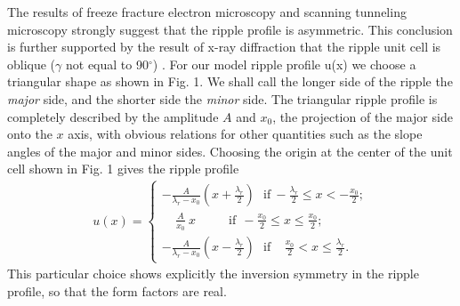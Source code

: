The results of freeze fracture electron microscopy \cite{Luna77,Cop80,Rup83} and
scanning tunneling microscopy \cite{Zas88a,Hata93} strongly suggest that the
ripple profile is asymmetric.  This conclusion is further supported by 
the result
of x-ray diffraction that the ripple unit cell is oblique
($\gamma$ not equal to 90$^{\circ}$) 
\cite{Tar73,JanSS79,Ino80,Ale85,Sir88,Wac89a,Kat95}.
For our model ripple profile
u(x) we choose a triangular shape as shown in
Fig. 1.  We shall call the longer side of the ripple
the {\it major} side, and the shorter side the {\it minor} side.
The triangular ripple profile is completely described by the amplitude
$A$ and $x_0$, the projection of the major side onto the $x$ axis,
with obvious relations for other quantities such as the slope angles
of the major and minor sides.  Choosing the origin at the center
of the unit cell shown in Fig. 1 gives the ripple profile
\begin{eqnarray}
\label{profile}
u(x) = \left\{ \begin{array}{ll}
		-\frac{A}{\lambda_r - x_0} (x + \frac{\lambda_r}{2})
\ \ \ \mbox{if}\ - \frac{\lambda_r}{2} \le x < - \frac{x_0}{2};\\
		\ \ \ \ \ \frac{A}{x_0}\ x\ \ \ \ \ \ \ \ \ \ \ \ \mbox{if}
\ \ - \frac{x_0}{2} \le x \le 
\frac{x_0}{2};\\
		-\frac{A}{\lambda_r - x_0} (x - \frac{\lambda_r}{2})
\ \ \ \mbox{if}\ \ \ \ \  \frac{x_0}{2} < x \le \frac{\lambda_r}{2}.
		\end{array}
	\right.
\end{eqnarray}
This particular choice shows explicitly the inversion
symmetry in the ripple profile, so that the form factors are real.

